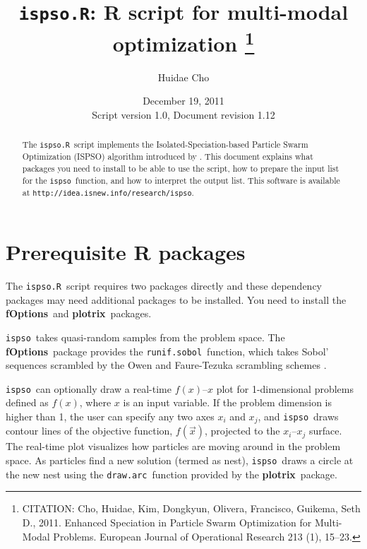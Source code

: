 \documentclass{article}
\def\ispsoR{\texttt{ispso.R}}
\def\ispso{\texttt{ispso}}
\def\fOptions{\textbf{fOptions}}
\def\plotrix{\textbf{plotrix}}
\def\runifsobol{\texttt{runif.sobol}}
\def\drawarc{\texttt{draw.arc}}
\begin{document}
\title{\ispsoR: R script for multi-modal optimization%
\footnote{CITATION: Cho, Huidae, Kim, Dongkyun, Olivera, Francisco, Guikema, Seth D., 2011.  Enhanced Speciation in Particle Swarm Optimization for Multi-Modal Problems.  European Journal of Operational Research 213 (1), 15--23.}}
\author{Huidae Cho}
\date{December 19, 2011\\Script version 1.0, Document revision 1.12}
\maketitle

\begin{abstract}
  The \ispsoR\ script implements the Isolated-Speciation-based Particle Swarm Optimization (ISPSO) algorithm introduced by \cite{Cho.ea.2011}.
  This document explains what packages you need to install to be able to use the script, how to prepare the input list for the \ispso\ function, and how to interpret the output list.
  This software is available at \texttt{http://idea.isnew.info/research/ispso}.
\end{abstract}

\tableofcontents

\section{Prerequisite R packages}

The \ispsoR\ script requires two packages directly and these dependency packages may need additional packages to be installed.
You need to install the \fOptions\ and \plotrix\ packages.

\ispso\ takes quasi-random samples from the problem space.
The \fOptions\ package provides the \runifsobol\ function, which takes Sobol' sequences \citep{Sobol'.1967} scrambled by the Owen and Faure-Tezuka scrambling schemes \citep{Owen.1998, Faure.Tezuka.2002}.

\ispso\ can optionally draw a real-time $f(x)$--$x$ plot for 1-dimensional problems defined as $f(x)$, where $x$ is an input variable.
If the problem dimension is higher than 1, the user can specify any two axes $x_i$ and $x_j$, and \ispso\ draws contour lines of the objective function, $f(\vec{x})$, projected to the $x_i$--$x_j$ surface.
The real-time plot visualizes how particles are moving around in the problem space.
As particles find a new solution (termed as nest), \ispso\ draws a circle at the new nest using the \drawarc\ function provided by the \plotrix\ package.
\end{document}
